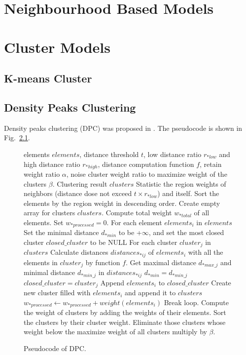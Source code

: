 \documentclass[runningheads,openany]{xhlPaper}
\begin{document}
\chapter{Neighbourhood Based Models}

\chapter{Cluster Models}

\section{K-means Cluster}

\section{Density Peaks Clustering}
\label{sec:density_peaks}
Density peaks clustering (DPC) was proposed in \cite{Density_Cluster}.
The pseudocode is shown in Fig.~\ref{fig:density_peaks_pseudocode}.

\begin{figure}
\caption{Pseudocode of DPC.}
\label{fig:density_peaks_pseudocode}
\begin{algorithmic}
\REQUIRE  elements $elements$, distance threshold $t$, low distance ratio $r_{*low}$ and high distance ratio $r_{*high}$, distance computation function $f$, retain weight ratio $\alpha$, noise cluster weight ratio to maximize weight of the clusters $\beta$.
\ENSURE Clustering result $clusters$
\STATE 
\STATE Statistic the region weights of neighbors (distance dose not exceed $t \times  r_{*low}$) and itself.
\STATE Sort the elements by the region weight in descending order.
\STATE Create empty array for clusters $clusters$.
\STATE Compute total weight $w_{*total}$ of all elements.
\STATE Set $w_{*processed} = 0$.
\STATE 
\LOOP 
\STATE For each element $elements_{i}$ in $elements$
\STATE Set the minimal distance $d_{*min}$ to be +$\infty$, and set the most closed cluster $closed\_cluster$ to be NULL
	\LOOP
		\STATE For each cluster $cluster_{j}$ in $clusters$
		\STATE Calculate distances $distances_{*ij}$ of $elements_{i}$ with  all the elements in $cluster_{j}$ by function $f$.
		\STATE Get maximal distance $d_{*max\_j}$ and minimal distance $d_{*min\_j}$ in $distances_{*ij}$
			\STATE $d_{*min} = d_{*min\_j}$
			\STATE $closed\_cluster = cluster_{j}$
		\ENDIF
	\ENDLOOP
	\STATE
		\STATE Append  $elements_{i}$ to $closed\_cluster$
	\ELSE 
		\STATE Create new cluster filled with $elements_{i}$ and append it to $clusters$
	\ENDIF
	\STATE $w_{*processed} \leftarrow w_{*processed}  + weight(elements_{i})$
		\STATE Break loop.
	\ENDIF
\ENDLOOP
\STATE
\STATE Compute the weight of clusters by adding the weights of their elements.
\STATE Sort the clusters by their cluster weight.
\STATE Eliminate those clusters whose weight below the maximize weight of all clusters multiply by $\beta$.
\end{algorithmic}
\end{figure}
\end{document}

